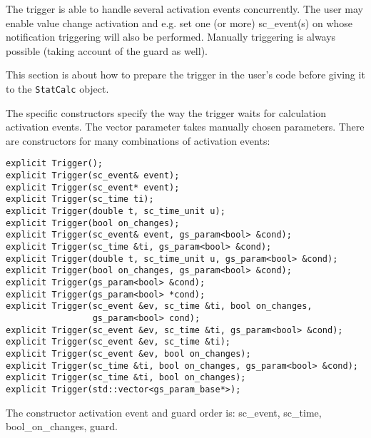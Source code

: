 The trigger is able to handle several activation events concurrently. The user may enable value change activation and e.g. set one (or more) sc\_event(s) on whose notification triggering will also be performed. Manually triggering is always possible (taking account of the guard as well).


This section is about how to prepare the trigger in the user's code before giving it to the \lstinline|StatCalc| object.

The specific constructors specify the way the trigger waits for calculation activation events. The vector parameter takes manually chosen parameters. There are constructors for many combinations of activation events:
\begin{lstlisting}[caption={Trigger constructors with several calculation activation events and guard}]
explicit Trigger();
explicit Trigger(sc_event& event);
explicit Trigger(sc_event* event);
explicit Trigger(sc_time ti);
explicit Trigger(double t, sc_time_unit u);
explicit Trigger(bool on_changes);
explicit Trigger(sc_event& event, gs_param<bool> &cond);
explicit Trigger(sc_time &ti, gs_param<bool> &cond);
explicit Trigger(double t, sc_time_unit u, gs_param<bool> &cond);
explicit Trigger(bool on_changes, gs_param<bool> &cond);
explicit Trigger(gs_param<bool> &cond);
explicit Trigger(gs_param<bool> *cond);
explicit Trigger(sc_event &ev, sc_time &ti, bool on_changes, 
                 gs_param<bool> cond);
explicit Trigger(sc_event &ev, sc_time &ti, gs_param<bool> &cond);
explicit Trigger(sc_event &ev, sc_time &ti);
explicit Trigger(sc_event &ev, bool on_changes);
explicit Trigger(sc_time &ti, bool on_changes, gs_param<bool> &cond);
explicit Trigger(sc_time &ti, bool on_changes);
explicit Trigger(std::vector<gs_param_base*>);
\end{lstlisting}

The constructor activation event and guard order is: 
{\sffamily sc\_event}, {\sffamily sc\_time}, {\sffamily bool\_on\_changes}, {\sffamily guard}.

